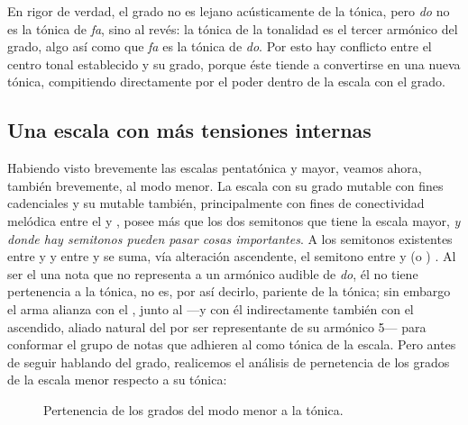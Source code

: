 \documentclass[a4paper,12pt]{article}
\begin{document}
\begin{multicols}{2}
    En rigor de verdad, el  grado no es lejano acústicamente de la tónica, pero \emph{do} no es la tónica de \emph{fa}, sino al revés: la tónica de la tonalidad es el tercer armónico del  grado, algo así como que \emph{fa} es la tónica de \emph{do}. Por esto hay conflicto entre el centro tonal establecido y su  grado, porque éste tiende a convertirse en una nueva tónica, compitiendo directamente por el poder dentro de la escala con el  grado.

    \subsection{Una escala con más tensiones internas}\label{subsec:esc-mas-tensiones}
    Habiendo visto brevemente las escalas pentatónica y mayor, veamos ahora, también brevemente, al modo menor. La escala  con su  grado mutable con fines cadenciales y su  mutable también, principalmente con fines de conectividad melódica entre el  y , posee más que los dos semitonos que tiene la escala mayor, \emph{y donde hay semitonos pueden pasar cosas importantes}. A los semitonos existentes entre  y  y entre  y  se suma, vía alteración ascendente, el semitono entre  y  (o ) \hbox{.} Al ser el  una nota que no representa a un armónico audible de \emph{do}, él no tiene pertenencia a la tónica, no es, por así decirlo, pariente de la tónica; sin embargo el  arma alianza con el , junto al  ---y con él indirectamente también con el  ascendido, aliado natural del  por ser representante de su armónico 5--- para conformar el grupo de notas que adhieren al  como tónica de la escala. Pero antes de seguir hablando del  grado, realicemos el análisis de pernetencia de los grados de la escala menor respecto a su tónica:
\end{multicols}

\begin{figure}[ht]
\centering
{}
\caption{Pertenencia de los grados del modo menor a la tónica.}\label{fig:pertenencia-menor}
\end{figure}
\end{document}
